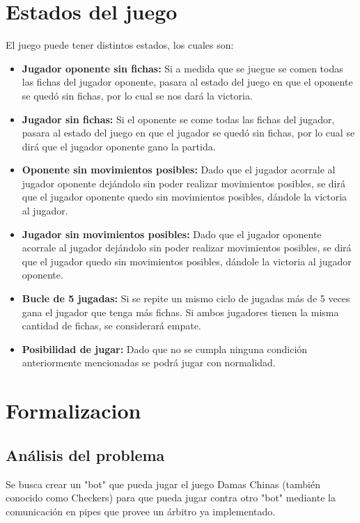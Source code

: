 \documentclass[12pt]{article}
\begin{document}
\section{Estados del juego}
    El juego puede tener distintos estados, los cuales son:
    \begin{itemize}
        \item\textbf{Jugador oponente sin fichas:}
            Si a medida que se juegue se comen todas las fichas del jugador oponente, pasara al estado del juego en que el oponente se quedó sin fichas, por lo cual se nos dará la victoria.
            
        \item\textbf{Jugador sin fichas:}
            Si el oponente se come todas las fichas del jugador, pasara al estado del juego en que el jugador se quedó sin fichas, por lo cual se dirá que el jugador oponente gano la partida.
        
        \item\textbf{Oponente sin movimientos posibles:}
            Dado que el jugador acorrale al jugador oponente dejándolo sin poder realizar movimientos posibles, se dirá que el jugador oponente quedo sin movimientos posibles, dándole la victoria al jugador. 
        
        \item\textbf{Jugador sin movimientos posibles:}
            Dado que el jugador oponente acorrale al jugador dejándolo sin poder realizar movimientos posibles, se dirá que el jugador quedo sin movimientos posibles, dándole la victoria al jugador oponente.
            
        
        \item\textbf{Bucle de 5 jugadas:}
            Si se repite un mismo ciclo de jugadas más de 5 veces gana el jugador que tenga más fichas. Si ambos jugadores tienen la misma cantidad de fichas, se considerará empate.
        
        \item\textbf{Posibilidad de jugar:}
            Dado que no se cumpla ninguna condición anteriormente mencionadas se podrá jugar con normalidad.

        
    \end{itemize}
    
\section{Formalizacion}

    \subsection{Análisis del problema}
        Se busca crear un "bot" que pueda jugar el juego Damas Chinas (también conocido como Checkers) para que pueda jugar contra otro "bot" mediante la comunicación en pipes que provee un árbitro ya implementado.
        
\end{document}
